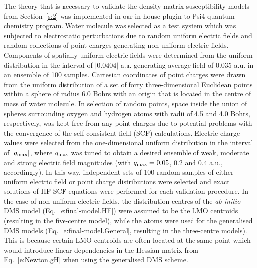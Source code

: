 \documentclass[aip,amsmath,amssymb,reprint,floatfix]{revtex4-1}
\begin{document}
The theory that is necessary to validate the density matrix susceptibility models from Section~\ref{s:2}
was implemented in our in\hyp{}house plugin to {\sc Psi4} quantum chemistry program.\cite{Psi4.JCTC.2017}
Water molecule was selected as a test system which was subjected to 
electrostatic perturbations due to random uniform electric fields and random collections of point charges
generating non\hyp{}uniform electric fields.
Components of spatially uniform electric fields were determined 
from the uniform distribution in the interval 
of $\vert 0.0404 \vert$ a.u. generating average field of 0.035 a.u. in an ensemble of 100 samples.
Cartesian coordinates of point charges were drawn from the uniform distribution 
of a set of forty three\hyp{}dimensional Euclidean points within a sphere of radius 6.0 Bohrs
with an origin that is located in the centre of mass of water molecule.
In selection of random points, space inside the union of spheres surrounding
oxygen and hydrogen atoms with radii of 4.5 and 4.0 Bohrs, respectively, was
kept free from any point charges due to potential problems with the convergence of the 
self\hyp{}consistent field (SCF) calculations.
Electric charge values were selected from the one\hyp{}dimensional uniform distribution
in the interval of $\vert q_{\rm max} \vert$, where $q_{\rm max}$
was tuned to obtain a desired ensemble of weak, moderate and strong electric field magnitudes
(with $q_{\rm max}=0.05$, $0.2$ and $0.4$ a.u., accordingly).
In this way, independent sets of 100 random samples of either uniform electric field or
point charge distributions were selected and exact solutions of HF\hyp{}SCF equations were 
performed for each validation procedure.
In the case of non\hyp{}uniform electric fields, the distribution centres 
of the \emph{ab initio} DMS model (Eq.~\eqref{e:final-model.HF}) were assumed 
to be the LMO centroids (resulting in the five\hyp{}centre model), 
while the atoms were used for the generalised DMS models (Eq.~\eqref{e:final-model.General}, 
resulting in the three\hyp{}centre models).
This is because certain LMO centroids are often located at the same point which would
introduce linear dependencies in the Hessian matrix from Eq.~\eqref{e:Newton.gH}
when using the generalised DMS scheme.
\end{document}
